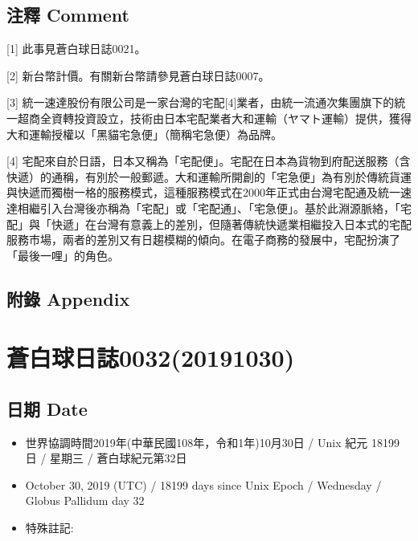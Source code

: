 \documentclass[a5paper, 12pt
]{book}
\providecommand{\tightlist}{%
  \setlength{\itemsep}{0pt}\setlength{\parskip}{0pt}}
\begin{document}
\hypertarget{ux6ce8ux91cb-comment-24}{%
\subsection{注釋 Comment}\label{ux6ce8ux91cb-comment-24}}

{[}1{]} 此事見蒼白球日誌0021。

{[}2{]} 新台幣計價。有關新台幣請參見蒼白球日誌0007。

{[}3{]}
統一速達股份有限公司是一家台灣的宅配{[}4{]}業者，由統一流通次集團旗下的統一超商全資轉投資設立，技術由日本宅配業者大和運輸（ヤマト運輸）提供，獲得大和運輸授權以「黑貓宅急便」（簡稱宅急便）為品牌。

{[}4{]}
宅配來自於日語，日本又稱為「宅配便」。宅配在日本為貨物到府配送服務（含快遞）的通稱，有別於一般郵遞。大和運輸所開創的「宅急便」為有別於傳統貨運與快遞而獨樹一格的服務模式，這種服務模式在2000年正式由台灣宅配通及統一速達相繼引入台灣後亦稱為「宅配」或「宅配通」、「宅急便」。基於此淵源脈絡，「宅配」與「快遞」在台灣有意義上的差別，但隨著傳統快遞業相繼投入日本式的宅配服務市場，兩者的差別又有日趨模糊的傾向。在電子商務的發展中，宅配扮演了「最後一哩」的角色。

\hypertarget{ux9644ux9304-appendix-23}{%
\subsection{附錄 Appendix}\label{ux9644ux9304-appendix-23}}

\hypertarget{ux84bcux767dux7403ux65e5ux8a8c003220191030}{%
\section{蒼白球日誌0032(20191030)}\label{ux84bcux767dux7403ux65e5ux8a8c003220191030}}

\hypertarget{ux65e5ux671f-date-31}{%
\subsection{日期 Date}\label{ux65e5ux671f-date-31}}

\begin{itemize}
\tightlist
\item
  世界協調時間2019年(中華民國108年，令和1年)10月30日 / Unix 紀元 18199
  日 / 星期三 / 蒼白球紀元第32日
\item
  October 30, 2019 (UTC) / 18199 days since Unix Epoch / Wednesday /
  Globus Pallidum day 32
\item
  特殊註記:
\end{itemize}
\end{document}
